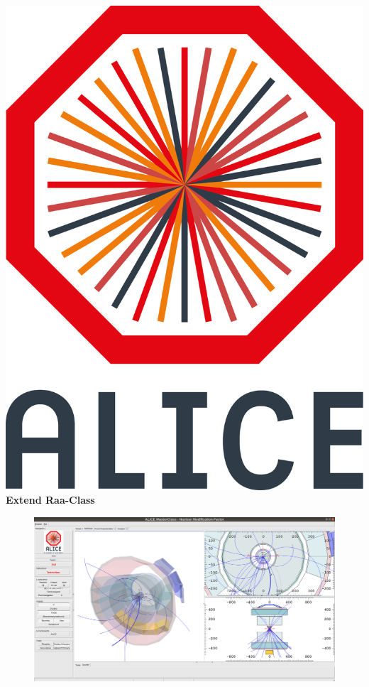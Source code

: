 \documentclass[aspectratio=169,14pt,dvipsnames]{beamer}
\begin{document}
\begin{frame}{\includegraphics[height=0.07\textheight]{2012-Jul-04-4_Color_Logo_CB.png} \hspace{0.2cm}\textbf{Extend Raa-Class}}
  \begin{figure}
    \centering
    \includegraphics[height=0.8\textheight]{EventDisplayAndTasks.png}\hspace{0cm}
  \end{figure}
\end{frame}
\end{document}
